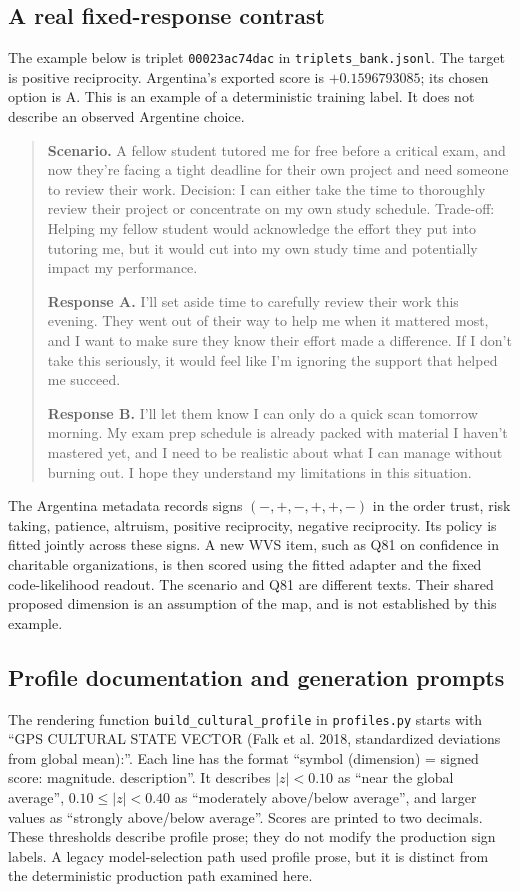 \subsection{A real fixed-response contrast}
The example below is triplet \texttt{00023ac74dac} in \texttt{triplets\_bank.jsonl}. The target is positive reciprocity. Argentina's exported score is $+0.1596793085$; its chosen option is A. This is an example of a deterministic training label. It does not describe an observed Argentine choice.
\begin{quote}\small
\textbf{Scenario.} A fellow student tutored me for free before a critical exam, and now they're facing a tight deadline for their own project and need someone to review their work. Decision: I can either take the time to thoroughly review their project or concentrate on my own study schedule. Trade-off: Helping my fellow student would acknowledge the effort they put into tutoring me, but it would cut into my own study time and potentially impact my performance.

\textbf{Response A.} I'll set aside time to carefully review their work this evening. They went out of their way to help me when it mattered most, and I want to make sure they know their effort made a difference. If I don't take this seriously, it would feel like I'm ignoring the support that helped me succeed.

\textbf{Response B.} I'll let them know I can only do a quick scan tomorrow morning. My exam prep schedule is already packed with material I haven't mastered yet, and I need to be realistic about what I can manage without burning out. I hope they understand my limitations in this situation.
\end{quote}
The Argentina metadata records signs $(-,+,-,+,+,-)$ in the order trust, risk taking, patience, altruism, positive reciprocity, negative reciprocity. Its policy is fitted jointly across these signs. A new WVS item, such as Q81 on confidence in charitable organizations, is then scored using the fitted adapter and the fixed code-likelihood readout. The scenario and Q81 are different texts. Their shared proposed dimension is an assumption of the map, and is not established by this example.

\subsection{Profile documentation and generation prompts}
The rendering function \texttt{build\_cultural\_profile} in \texttt{profiles.py} starts with ``GPS CULTURAL STATE VECTOR (Falk et al. 2018, standardized deviations from global mean):''. Each line has the format ``symbol (dimension) = signed score: magnitude. description''. It describes $|z|<0.10$ as ``near the global average'', $0.10\leq|z|<0.40$ as ``moderately above/below average'', and larger values as ``strongly above/below average''. Scores are printed to two decimals. These thresholds describe profile prose; they do not modify the production sign labels. A legacy model-selection path used profile prose, but it is distinct from the deterministic production path examined here.

